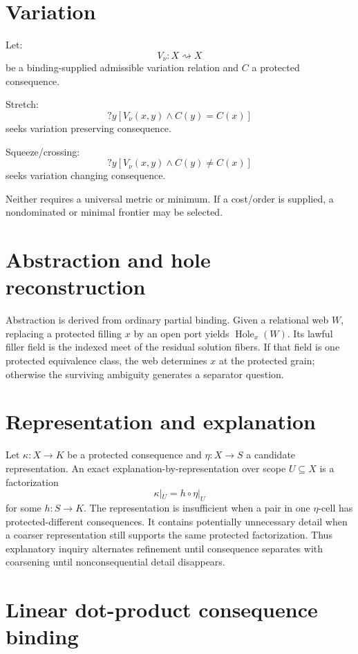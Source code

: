 \documentclass[11pt,oneside]{article}
\begin{document}
\section{Variation}

Let:
\[
V_\nu:X\rightsquigarrow X
\]
be a binding-supplied admissible variation relation and \(C\) a protected consequence.

Stretch:
\[
?y[
V_\nu(x,y)
\land
C(y)=C(x)
]
\]
seeks variation preserving consequence.

Squeeze/crossing:
\[
?y[
V_\nu(x,y)
\land
C(y)\neq C(x)
]
\]
seeks variation changing consequence.

Neither requires a universal metric or minimum.  If a cost/order is supplied, a nondominated or minimal frontier may be selected.


\section{Abstraction and hole reconstruction}

Abstraction is derived from ordinary partial binding.  Given a relational web \(W\), replacing a protected filling \(x\) by an open port yields \(\operatorname{Hole}_x(W)\).  Its lawful filler field is the indexed meet of the residual solution fibers.  If that field is one protected equivalence class, the web determines \(x\) at the protected grain; otherwise the surviving ambiguity generates a separator question.

\section{Representation and explanation}

Let \(\kappa:X\to K\) be a protected consequence and \(\eta:X\to S\) a candidate representation.  An exact explanation-by-representation over scope \(U\subseteq X\) is a factorization
\[
\boxed{
\kappa|_U=h\circ\eta|_U
}
\]
for some \(h:S\to K\).  The representation is insufficient when a pair in one \(\eta\)-cell has protected-different consequences.  It contains potentially unnecessary detail when a coarser representation still supports the same protected factorization.  Thus explanatory inquiry alternates refinement until consequence separates with coarsening until nonconsequential detail disappears.

\section{Linear dot-product consequence binding}
\end{document}
